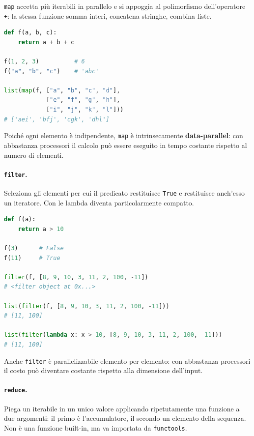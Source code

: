 \documentclass[12pt]{extarticle}
\begin{document}
\noindent \texttt{map} accetta più iterabili in parallelo e si appoggia al polimorfismo dell'operatore \texttt{+}: la stessa funzione somma interi, concatena stringhe, combina liste.

\begin{lstlisting}[language=Python]
def f(a, b, c):
    return a + b + c

f(1, 2, 3)          # 6
f("a", "b", "c")    # 'abc'

list(map(f, ["a", "b", "c", "d"],
            ["e", "f", "g", "h"],
            ["i", "j", "k", "l"]))
# ['aei', 'bfj', 'cgk', 'dhl']
\end{lstlisting}

\noindent Poiché ogni elemento è indipendente, \texttt{map} è intrinsecamente \textbf{data-parallel}: con abbastanza processori il calcolo può essere eseguito in tempo costante rispetto al numero di elementi.

\paragraph{\texttt{filter}.} Seleziona gli elementi per cui il predicato restituisce \texttt{True} e restituisce anch'esso un iteratore. Con le lambda diventa particolarmente compatto.

\begin{lstlisting}[language=Python]
def f(a):
    return a > 10

f(3)      # False
f(11)     # True

filter(f, [8, 9, 10, 3, 11, 2, 100, -11])
# <filter object at 0x...>

list(filter(f, [8, 9, 10, 3, 11, 2, 100, -11]))
# [11, 100]

list(filter(lambda x: x > 10, [8, 9, 10, 3, 11, 2, 100, -11]))
# [11, 100]
\end{lstlisting}

\noindent Anche \texttt{filter} è parallelizzabile elemento per elemento: con abbastanza processori il costo può diventare costante rispetto alla dimensione dell'input.

\paragraph{\texttt{reduce}.} Piega un iterabile in un unico valore applicando ripetutamente una funzione a due argomenti: il primo è l'accumulatore, il secondo un elemento della sequenza. Non è una funzione built-in, ma va importata da \texttt{functools}.
\end{document}
